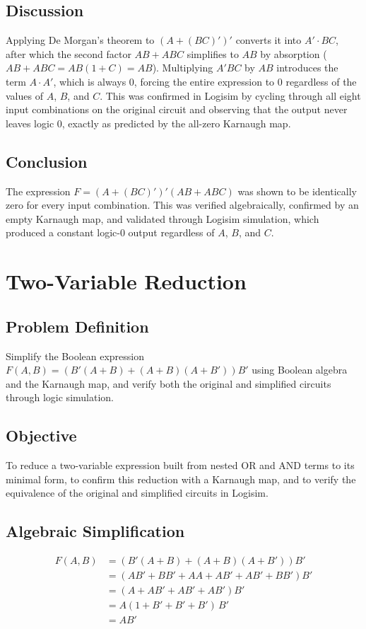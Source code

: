 \documentclass[12pt]{article}
\begin{document}
\subsection*{Discussion}
Applying De Morgan's theorem to $(A+(BC)')'$ converts it into $A' \cdot BC$, after which the second factor $AB + ABC$ simplifies to $AB$ by absorption ($AB + ABC = AB(1+C) = AB$). Multiplying $A'BC$ by $AB$ introduces the term $A \cdot A'$, which is always 0, forcing the entire expression to 0 regardless of the values of $A$, $B$, and $C$. This was confirmed in Logisim by cycling through all eight input combinations on the original circuit and observing that the output never leaves logic 0, exactly as predicted by the all-zero Karnaugh map.

\subsection*{Conclusion}
The expression $F = (A+(BC)')'(AB+ABC)$ was shown to be identically zero for every input combination. This was verified algebraically, confirmed by an empty Karnaugh map, and validated through Logisim simulation, which produced a constant logic-0 output regardless of $A$, $B$, and $C$.

\vspace{2cm}

\section{Two-Variable Reduction}

\subsection*{Problem Definition}
Simplify the Boolean expression $F(A,B) = (B'(A+B) + (A+B)(A+B'))B'$ using Boolean algebra and the Karnaugh map, and verify both the original and simplified circuits through logic simulation.

\subsection*{Objective}
To reduce a two-variable expression built from nested OR and AND terms to its minimal form, to confirm this reduction with a Karnaugh map, and to verify the equivalence of the original and simplified circuits in Logisim.

\subsection*{Algebraic Simplification}
\begin{align*}
F(A,B) &= (B'(A+B) + (A+B)(A+B'))B' \\
&= (AB' + BB' + AA + AB' + AB' + BB')B' \\
&= (A + AB' + AB' + AB')B' \\
&= A(1 + B' + B' + B')\,B' \\
&= AB'
\end{align*}
\end{document}
